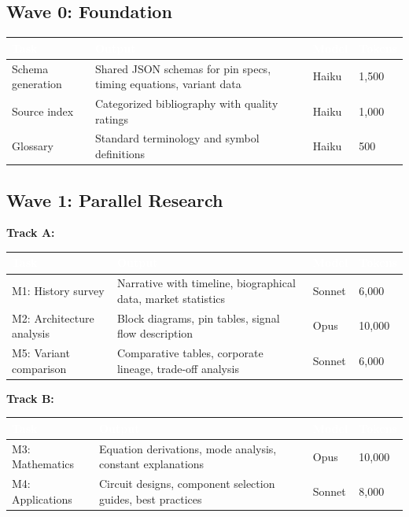 \documentclass[11pt,letterpaper]{article}
\newcommand{\tableheader}[1]{\textbf{\sffamily\textcolor{white}{#1}}}
\begin{document}
\subsection{Wave 0: Foundation}

\begin{center}
\begin{tabularx}{\textwidth}{L{3cm}XC{1.5cm}C{1.5cm}}
\toprule
{}
\tableheader{Task} & \tableheader{Output} & \tableheader{Model} & \tableheader{Tokens} \\
\midrule
Schema generation & Shared JSON schemas for pin specs, timing equations, variant data & Haiku & 1,500 \\
Source index & Categorized bibliography with quality ratings & Haiku & 1,000 \\
Glossary & Standard terminology and symbol definitions & Haiku & 500 \\
\bottomrule
\end{tabularx}
\end{center}

\subsection{Wave 1: Parallel Research}

\textbf{Track A:}

\begin{center}
\begin{tabularx}{\textwidth}{L{3cm}XC{1.5cm}C{1.5cm}}
\toprule
{}
\tableheader{Task} & \tableheader{Output} & \tableheader{Model} & \tableheader{Tokens} \\
\midrule
M1: History survey & Narrative with timeline, biographical data, market statistics & Sonnet & 6,000 \\
M2: Architecture analysis & Block diagrams, pin tables, signal flow description & Opus & 10,000 \\
M5: Variant comparison & Comparative tables, corporate lineage, trade-off analysis & Sonnet & 6,000 \\
\bottomrule
\end{tabularx}
\end{center}

\textbf{Track B:}

\begin{center}
\begin{tabularx}{\textwidth}{L{3cm}XC{1.5cm}C{1.5cm}}
\toprule
{}
\tableheader{Task} & \tableheader{Output} & \tableheader{Model} & \tableheader{Tokens} \\
\midrule
M3: Mathematics & Equation derivations, mode analysis, constant explanations & Opus & 10,000 \\
M4: Applications & Circuit designs, component selection guides, best practices & Sonnet & 8,000 \\
\bottomrule
\end{tabularx}
\end{center}
\end{document}
